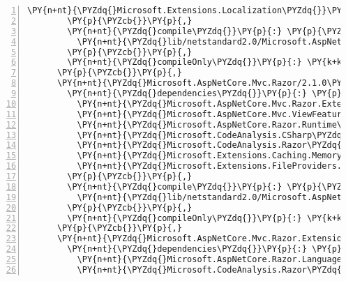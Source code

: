 \begin{Verbatim}[commandchars=\\\{\},numbers=left,firstnumber=1,stepnumber=1,numberblanklines=0]
          \PY{n+nt}{\PYZdq{}Microsoft.Extensions.Localization\PYZdq{}}\PY{p}{:} \PY{l+s+s2}{\PYZdq{}2.1.0\PYZhy{}rc1\PYZhy{}final\PYZdq{}}
        \PY{p}{\PYZcb{}}\PY{p}{,}
        \PY{n+nt}{\PYZdq{}compile\PYZdq{}}\PY{p}{:} \PY{p}{\PYZob{}}
          \PY{n+nt}{\PYZdq{}lib/netstandard2.0/Microsoft.AspNetCore.Mvc.Localization.dll\PYZdq{}}\PY{p}{:} \PY{p}{\PYZob{}}\PY{p}{\PYZcb{}}
        \PY{p}{\PYZcb{}}\PY{p}{,}
        \PY{n+nt}{\PYZdq{}compileOnly\PYZdq{}}\PY{p}{:} \PY{k+kc}{true}
      \PY{p}{\PYZcb{}}\PY{p}{,}
      \PY{n+nt}{\PYZdq{}Microsoft.AspNetCore.Mvc.Razor/2.1.0\PYZhy{}rc1\PYZhy{}final\PYZdq{}}\PY{p}{:} \PY{p}{\PYZob{}}
        \PY{n+nt}{\PYZdq{}dependencies\PYZdq{}}\PY{p}{:} \PY{p}{\PYZob{}}
          \PY{n+nt}{\PYZdq{}Microsoft.AspNetCore.Mvc.Razor.Extensions\PYZdq{}}\PY{p}{:} \PY{l+s+s2}{\PYZdq{}2.1.0\PYZhy{}rc1\PYZhy{}final\PYZdq{}}\PY{p}{,}
          \PY{n+nt}{\PYZdq{}Microsoft.AspNetCore.Mvc.ViewFeatures\PYZdq{}}\PY{p}{:} \PY{l+s+s2}{\PYZdq{}2.1.0\PYZhy{}rc1\PYZhy{}final\PYZdq{}}\PY{p}{,}
          \PY{n+nt}{\PYZdq{}Microsoft.AspNetCore.Razor.Runtime\PYZdq{}}\PY{p}{:} \PY{l+s+s2}{\PYZdq{}2.1.0\PYZhy{}rc1\PYZhy{}final\PYZdq{}}\PY{p}{,}
          \PY{n+nt}{\PYZdq{}Microsoft.CodeAnalysis.CSharp\PYZdq{}}\PY{p}{:} \PY{l+s+s2}{\PYZdq{}2.8.0\PYZhy{}beta3\PYZdq{}}\PY{p}{,}
          \PY{n+nt}{\PYZdq{}Microsoft.CodeAnalysis.Razor\PYZdq{}}\PY{p}{:} \PY{l+s+s2}{\PYZdq{}2.1.0\PYZhy{}rc1\PYZhy{}final\PYZdq{}}\PY{p}{,}
          \PY{n+nt}{\PYZdq{}Microsoft.Extensions.Caching.Memory\PYZdq{}}\PY{p}{:} \PY{l+s+s2}{\PYZdq{}2.1.0\PYZhy{}rc1\PYZhy{}final\PYZdq{}}\PY{p}{,}
          \PY{n+nt}{\PYZdq{}Microsoft.Extensions.FileProviders.Composite\PYZdq{}}\PY{p}{:} \PY{l+s+s2}{\PYZdq{}2.1.0\PYZhy{}rc1\PYZhy{}final\PYZdq{}}
        \PY{p}{\PYZcb{}}\PY{p}{,}
        \PY{n+nt}{\PYZdq{}compile\PYZdq{}}\PY{p}{:} \PY{p}{\PYZob{}}
          \PY{n+nt}{\PYZdq{}lib/netstandard2.0/Microsoft.AspNetCore.Mvc.Razor.dll\PYZdq{}}\PY{p}{:} \PY{p}{\PYZob{}}\PY{p}{\PYZcb{}}
        \PY{p}{\PYZcb{}}\PY{p}{,}
        \PY{n+nt}{\PYZdq{}compileOnly\PYZdq{}}\PY{p}{:} \PY{k+kc}{true}
      \PY{p}{\PYZcb{}}\PY{p}{,}
      \PY{n+nt}{\PYZdq{}Microsoft.AspNetCore.Mvc.Razor.Extensions/2.1.0\PYZhy{}rc1\PYZhy{}final\PYZdq{}}\PY{p}{:} \PY{p}{\PYZob{}}
        \PY{n+nt}{\PYZdq{}dependencies\PYZdq{}}\PY{p}{:} \PY{p}{\PYZob{}}
          \PY{n+nt}{\PYZdq{}Microsoft.AspNetCore.Razor.Language\PYZdq{}}\PY{p}{:} \PY{l+s+s2}{\PYZdq{}2.1.0\PYZhy{}rc1\PYZhy{}final\PYZdq{}}\PY{p}{,}
          \PY{n+nt}{\PYZdq{}Microsoft.CodeAnalysis.Razor\PYZdq{}}\PY{p}{:} \PY{l+s+s2}{\PYZdq{}2.1.0\PYZhy{}rc1\PYZhy{}final\PYZdq{}}

\end{Verbatim}
